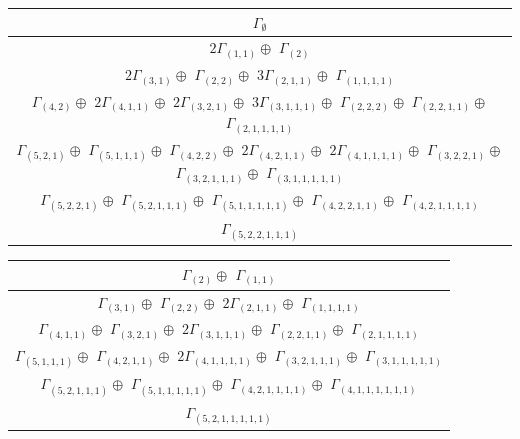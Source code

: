 \documentclass[main.tex]{subfiles}
\begin{document}
\bigskip
\begin{minipage}{1\textwidth}
\centering
\begin{tabular}{c}
$\Gamma_\emptyset$
\\ \hline
$ 2 \Gamma_{(
1 , 
1
)} \oplus$
$\Gamma_{(
2
)}$
\\ \hline
$ 2 \Gamma_{(
3 , 
1
)} \oplus$
$\Gamma_{(
2 , 
2
)} \oplus$
$ 3 \Gamma_{(
2 , 
1 , 
1
)} \oplus$
$\Gamma_{(
1 , 
1 , 
1 , 
1
)}$
\\ \hline
$\Gamma_{(
4 , 
2
)} \oplus$
$ 2 \Gamma_{(
4 , 
1 , 
1
)} \oplus$
$ 2 \Gamma_{(
3 , 
2 , 
1
)} \oplus$
$ 3 \Gamma_{(
3 , 
1 , 
1 , 
1
)} \oplus$
$\Gamma_{(
2 , 
2 , 
2
)} \oplus$
$\Gamma_{(
2 , 
2 , 
1 , 
1
)} \oplus$
$\Gamma_{(
2 , 
1 , 
1 , 
1 , 
1
)}$
\\ \hline
$\Gamma_{(
5 , 
2 , 
1
)} \oplus$
$\Gamma_{(
5 , 
1 , 
1 , 
1
)} \oplus$
$\Gamma_{(
4 , 
2 , 
2
)} \oplus$
$ 2 \Gamma_{(
4 , 
2 , 
1 , 
1
)} \oplus$
$ 2 \Gamma_{(
4 , 
1 , 
1 , 
1 , 
1
)} \oplus$
$\Gamma_{(
3 , 
2 , 
2 , 
1
)} \oplus$
$\Gamma_{(
3 , 
2 , 
1 , 
1 , 
1
)} \oplus$
$\Gamma_{(
3 , 
1 , 
1 , 
1 , 
1 , 
1
)}$
\\ \hline
$\Gamma_{(
5 , 
2 , 
2 , 
1
)} \oplus$
$\Gamma_{(
5 , 
2 , 
1 , 
1 , 
1
)} \oplus$
$\Gamma_{(
5 , 
1 , 
1 , 
1 , 
1 , 
1
)} \oplus$
$\Gamma_{(
4 , 
2 , 
2 , 
1 , 
1
)} \oplus$
$\Gamma_{(
4 , 
2 , 
1 , 
1 , 
1 , 
1
)}$
\\ \hline
$\Gamma_{(
5 , 
2 , 
2 , 
1 , 
1 , 
1
)}$
\\
\end{tabular}\end{minipage}
\bigskip
\begin{minipage}{.7\textwidth}
\centering
\begin{tabular}{c}
$\Gamma_{(
2
)} \oplus$
$\Gamma_{(
1 , 
1
)}$
\\ \hline
$\Gamma_{(
3 , 
1
)} \oplus$
$\Gamma_{(
2 , 
2
)} \oplus$
$ 2 \Gamma_{(
2 , 
1 , 
1
)} \oplus$
$\Gamma_{(
1 , 
1 , 
1 , 
1
)}$
\\ \hline
$\Gamma_{(
4 , 
1 , 
1
)} \oplus$
$\Gamma_{(
3 , 
2 , 
1
)} \oplus$
$ 2 \Gamma_{(
3 , 
1 , 
1 , 
1
)} \oplus$
$\Gamma_{(
2 , 
2 , 
1 , 
1
)} \oplus$
$\Gamma_{(
2 , 
1 , 
1 , 
1 , 
1
)}$
\\ \hline
$\Gamma_{(
5 , 
1 , 
1 , 
1
)} \oplus$
$\Gamma_{(
4 , 
2 , 
1 , 
1
)} \oplus$
$ 2 \Gamma_{(
4 , 
1 , 
1 , 
1 , 
1
)} \oplus$
$\Gamma_{(
3 , 
2 , 
1 , 
1 , 
1
)} \oplus$
$\Gamma_{(
3 , 
1 , 
1 , 
1 , 
1 , 
1
)}$
\\ \hline
$\Gamma_{(
5 , 
2 , 
1 , 
1 , 
1
)} \oplus$
$\Gamma_{(
5 , 
1 , 
1 , 
1 , 
1 , 
1
)} \oplus$
$\Gamma_{(
4 , 
2 , 
1 , 
1 , 
1 , 
1
)} \oplus$
$\Gamma_{(
4 , 
1 , 
1 , 
1 , 
1 , 
1 , 
1
)}$
\\ \hline
$\Gamma_{(
5 , 
2 , 
1 , 
1 , 
1 , 
1 , 
1
)}$
\\
\end{tabular}\end{minipage}
\end{document}
